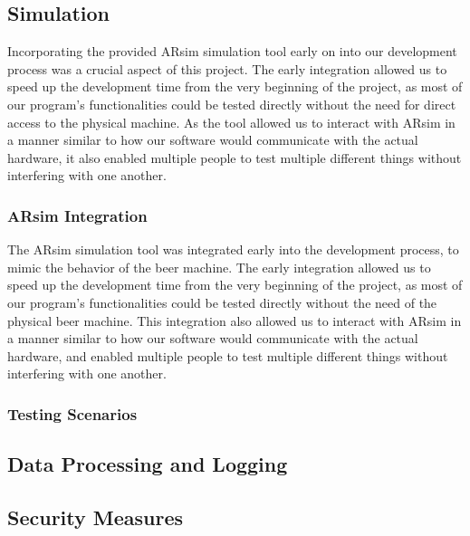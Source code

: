 \subsection{Simulation}
Incorporating the provided ARsim simulation tool early on into our development process was a crucial aspect of this project. 
The early integration allowed us to speed up the development time from the very beginning of the project, as most of our program's functionalities could be tested directly without the need for direct access to the physical machine.
As the tool allowed us to interact with ARsim in a manner similar to how our software would communicate with the actual hardware, it also enabled multiple people to test multiple different things without interfering with one another.

\subsubsection{ARsim Integration}
The ARsim simulation tool was integrated early into the development process, to mimic the behavior of the beer machine.
The early integration allowed us to speed up the development time from the very beginning of the project, as most of our program's functionalities could be tested directly without the need of the physical beer machine.
This integration also allowed us to interact with ARsim in a manner similar to how our software would communicate with the actual hardware, and enabled multiple people to test multiple different things without interfering with one another. 

\subsubsection{Testing Scenarios}


\subsection{Data Processing and Logging}

\subsection{Security Measures}

